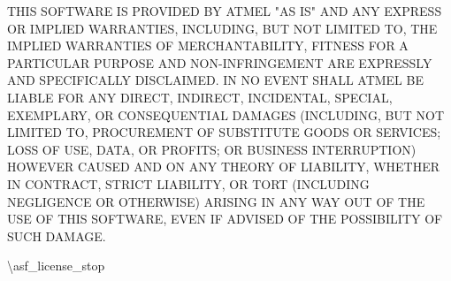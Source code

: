 THIS SOFTWARE IS PROVIDED BY ATMEL "{}\+AS IS"{} AND ANY EXPRESS OR IMPLIED WARRANTIES, INCLUDING, BUT NOT LIMITED TO, THE IMPLIED WARRANTIES OF MERCHANTABILITY, FITNESS FOR A PARTICULAR PURPOSE AND NON-\/\+INFRINGEMENT ARE EXPRESSLY AND SPECIFICALLY DISCLAIMED. IN NO EVENT SHALL ATMEL BE LIABLE FOR ANY DIRECT, INDIRECT, INCIDENTAL, SPECIAL, EXEMPLARY, OR CONSEQUENTIAL DAMAGES (INCLUDING, BUT NOT LIMITED TO, PROCUREMENT OF SUBSTITUTE GOODS OR SERVICES; LOSS OF USE, DATA, OR PROFITS; OR BUSINESS INTERRUPTION) HOWEVER CAUSED AND ON ANY THEORY OF LIABILITY, WHETHER IN CONTRACT, STRICT LIABILITY, OR TORT (INCLUDING NEGLIGENCE OR OTHERWISE) ARISING IN ANY WAY OUT OF THE USE OF THIS SOFTWARE, EVEN IF ADVISED OF THE POSSIBILITY OF SUCH DAMAGE.

\textbackslash{}asf\+\_\+license\+\_\+stop 
